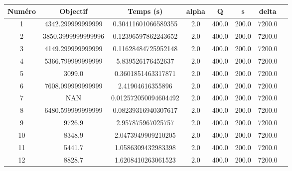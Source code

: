 \begin{tabular}{|c|c|c|c|c|c|c|c|}
\hline
 Numéro & Objectif & Temps (s) & alpha & Q & s & delta \\
\hline
1 & 4342.299999999999 & 0.30411601066589355 & 2.0 & 400.0 & 200.0 & 7200.0 \\ 
 \hline
2 & 3850.3999999999996 & 0.12396597862243652 & 2.0 & 400.0 & 200.0 & 7200.0 \\ 
 \hline
3 & 4149.299999999999 & 0.11628484725952148 & 2.0 & 400.0 & 200.0 & 7200.0 \\ 
 \hline
4 & 5366.799999999999 & 5.839526176452637 & 2.0 & 400.0 & 200.0 & 7200.0 \\ 
 \hline
5 & 3099.0 & 0.3601851463317871 & 2.0 & 400.0 & 200.0 & 7200.0 \\ 
 \hline
6 & 7608.099999999999 & 2.41904616355896 & 2.0 & 400.0 & 200.0 & 7200.0 \\ 
 \hline
7 & NAN & 0.012572050094604492 & 2.0 & 400.0 & 200.0 & 7200.0 \\ 
 \hline
8 & 6480.599999999999 & 0.08239316940307617 & 2.0 & 400.0 & 200.0 & 7200.0 \\ 
 \hline
9 & 9726.9 & 2.957875967025757 & 2.0 & 400.0 & 200.0 & 7200.0 \\ 
 \hline
10 & 8348.9 & 2.0473949909210205 & 2.0 & 400.0 & 200.0 & 7200.0 \\ 
 \hline
11 & 5441.7 & 1.0586309432983398 & 2.0 & 400.0 & 200.0 & 7200.0 \\ 
 \hline
12 & 8828.7 & 1.6208410263061523 & 2.0 & 400.0 & 200.0 & 7200.0 \\ 
 \hline
\end{tabular}
